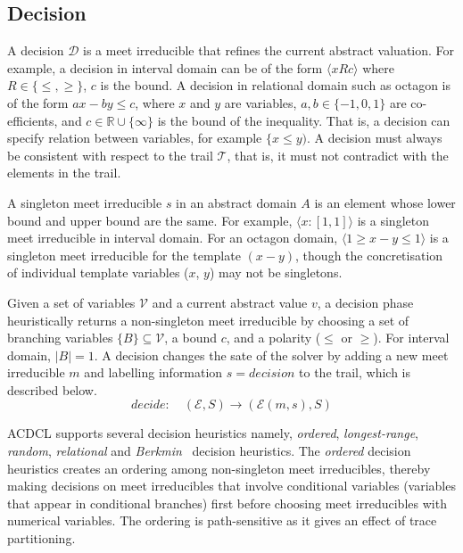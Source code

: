 \subsection{Decision}
A decision $\mathcal{D}$ is a meet irreducible that refines the 
current abstract valuation.  For example, a decision in interval 
domain can be of the form $\langle x R c \rangle$ where 
$R \in \{\leq, \geq\}$, $c$ is the bound.  A decision in 
relational domain such as octagon is of the form $ax - by \leq c$, 
where $x$ and $y$ are variables, $a,b \in \{-1,0,1\}$ are co-efficients, 
and $c \in \mathbb{R}\cup\{\infty\}$ is the bound of the inequality.  
That is, a decision can specify relation between variables, for example 
$\{x \leq y)$.  A decision must always be consistent with respect to 
the trail $\mathcal{T}$, that is, it must not contradict with the elements 
in the trail.  

A singleton meet irreducible $s$ in an abstract domain $A$ is an element 
whose lower bound and upper bound are the same.  For example, 
$\langle x:[1,1] \rangle$ is a singleton meet irreducible in interval domain.  
For an octagon domain, $\langle 1 \geq x-y \leq 1 \rangle$ is a singleton meet 
irreducible for the template $(x-y)$, though the concretisation of individual 
template variables ($x$, $y$) may not be singletons.   

Given a set of variables $\mathcal{V}$ and a current abstract value $v$, 
a decision phase heuristically returns a non-singleton meet irreducible 
by choosing a set of branching variables $\{B\} \subseteq \mathcal{V}$, 
a bound $c$, and a polarity ($\leq$ or $\geq$).  For interval domain, $|B|=1$.  
A decision changes the sate of the solver by adding a new meet irreducible 
$m$ and labelling information $s=decision$ to the trail, which is described below. 
\[decide: \quad (\mathcal{E},S) \rightarrow (\mathcal{E}(m,s),S) \]


ACDCL supports several decision heuristics namely, {\em ordered}, 
{\em longest-range}, {\em random}, {\em relational} and 
{\em Berkmin}~\cite{eugoldberg07} decision heuristics.  
The {\em ordered} decision heuristics creates an ordering among non-singleton 
meet irreducibles, thereby making decisions on meet irreducibles that involve 
conditional variables (variables that appear in conditional branches) first 
before choosing meet irreducibles with numerical variables.  
The ordering is path-sensitive as it gives an effect of trace partitioning.  

